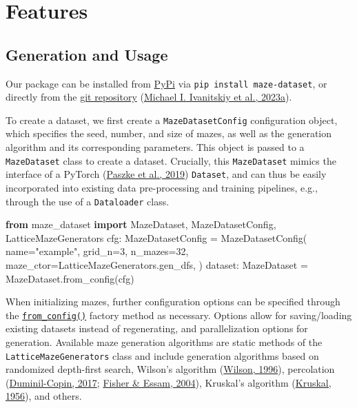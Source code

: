 \documentclass[10pt,a4paper,onecolumn]{article}
\newenvironment{Shaded}{}{}
\newcommand{\DecValTok}[1]{\textcolor[rgb]{0.25,0.63,0.44}{#1}}
\newcommand{\ImportTok}[1]{\textcolor[rgb]{0.00,0.50,0.00}{\textbf{#1}}}
\newcommand{\NormalTok}[1]{#1}
\newcommand{\OperatorTok}[1]{\textcolor[rgb]{0.40,0.40,0.40}{#1}}
\newcommand{\StringTok}[1]{\textcolor[rgb]{0.25,0.44,0.63}{#1}}
\begin{document}
\hypertarget{features}{%
\section{Features}\label{features}}

\hypertarget{generation}{%
\subsection{Generation and Usage}\label{generation}}

Our package can be installed from
\href{https://pypi.org/project/maze-dataset/}{PyPi} via
\texttt{pip\ install\ maze-dataset}, or directly from the
\href{https://github.com/understanding-search/maze-dataset}{git
repository} (\protect\hyperlink{ref-maze-dataset-github}{Michael I.
Ivanitskiy et al., 2023a}).

To create a dataset, we first create a \texttt{MazeDatasetConfig}
configuration object, which specifies the seed, number, and size of
mazes, as well as the generation algorithm and its corresponding
parameters. This object is passed to a \texttt{MazeDataset} class to
create a dataset. Crucially, this \texttt{MazeDataset} mimics the
interface of a PyTorch (\protect\hyperlink{ref-pytorch}{Paszke et al.,
2019}) \texttt{Dataset}, and can thus be easily incorporated into
existing data pre-processing and training pipelines, e.g., through the
use of a \texttt{Dataloader} class.

\begin{Shaded}
\begin{Highlighting}[]
\ImportTok{from}\NormalTok{ maze\_dataset }\ImportTok{import}\NormalTok{ MazeDataset, MazeDatasetConfig, LatticeMazeGenerators}
\NormalTok{cfg: MazeDatasetConfig }\OperatorTok{=}\NormalTok{ MazeDatasetConfig(}
\NormalTok{    name}\OperatorTok{=}\StringTok{"example"}\NormalTok{, }
\NormalTok{    grid\_n}\OperatorTok{=}\DecValTok{3}\NormalTok{, }
\NormalTok{    n\_mazes}\OperatorTok{=}\DecValTok{32}\NormalTok{, }
\NormalTok{    maze\_ctor}\OperatorTok{=}\NormalTok{LatticeMazeGenerators.gen\_dfs,}
\NormalTok{)}
\NormalTok{dataset: MazeDataset }\OperatorTok{=}\NormalTok{ MazeDataset.from\_config(cfg)}
\end{Highlighting}
\end{Shaded}

When initializing mazes, further configuration options can be specified
through the
\href{https://understanding-search.github.io/maze-dataset/maze_dataset.html\#MazeDataset.from_config}{\texttt{from\_config()}}
factory method as necessary. Options allow for saving/loading existing
datasets instead of regenerating, and parallelization options for
generation. Available maze generation algorithms are static methods of
the \texttt{LatticeMazeGenerators} class and include generation
algorithms based on randomized depth-first search, Wilson's algorithm
(\protect\hyperlink{ref-wilson}{Wilson, 1996}), percolation
(\protect\hyperlink{ref-percolation}{Duminil-Copin, 2017};
\protect\hyperlink{ref-percolation-clustersize}{Fisher \& Essam, 2004}),
Kruskal's algorithm
(\protect\hyperlink{ref-kruskal1956shortest}{Kruskal, 1956}), and
others.
\end{document}
